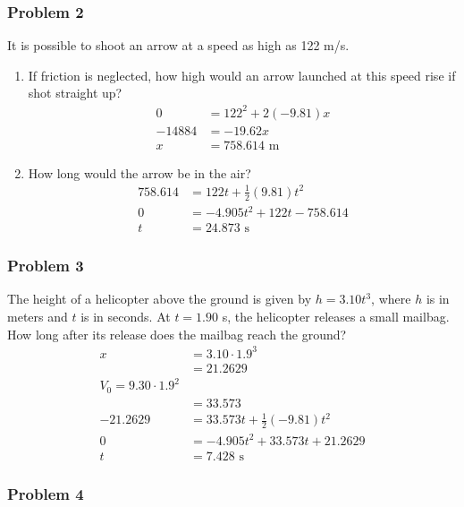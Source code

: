 \documentclass[
  letterpaper,
  DIV=11,
  numbers=noendperiod]{scrartcl}
\begin{document}
\hypertarget{problem-2-3}{%
\subsubsection{Problem 2}\label{problem-2-3}}

It is possible to shoot an arrow at a speed as high as 122 m/s.

\begin{enumerate}
\def\labelenumi{(\alph{enumi})}
\item
  If friction is neglected, how high would an arrow launched at this
  speed rise if shot straight up? \begin{align*}
  0 &= 122^2 + 2(-9.81)x \\
  -14884 &= -19.62x \\
  x &= 758.614 \text{ m}
  \end{align*}
\item
  How long would the arrow be in the air? \begin{align*}
  758.614 &= 122t + \frac{1}{2}(9.81)t^2 \\
  0 &= -4.905t^2 + 122t - 758.614 \\
  t &= 24.873 \text{ s}
  \end{align*}
\end{enumerate}

\hypertarget{problem-3-3}{%
\subsubsection{Problem 3}\label{problem-3-3}}

The height of a helicopter above the ground is given by \(h = 3.10t^3\),
where \(h\) is in meters and \(t\) is in seconds. At \(t = 1.90\) s, the
helicopter releases a small mailbag. How long after its release does the
mailbag reach the ground? \begin{align*}
x &= 3.10 \cdot 1.9^3 \\ 
&= 21.2629 \\
V_0 = 9.30 \cdot 1.9^2 \\
&= 33.573 \\
-21.2629 &= 33.573t + \frac{1}{2}(-9.81)t^2 \\
0 &= -4.905t^2 + 33.573t + 21.2629 \\
t &= 7.428 \text{ s}
\end{align*}

\hypertarget{problem-4-3}{%
\subsubsection{Problem 4}\label{problem-4-3}}
\end{document}
